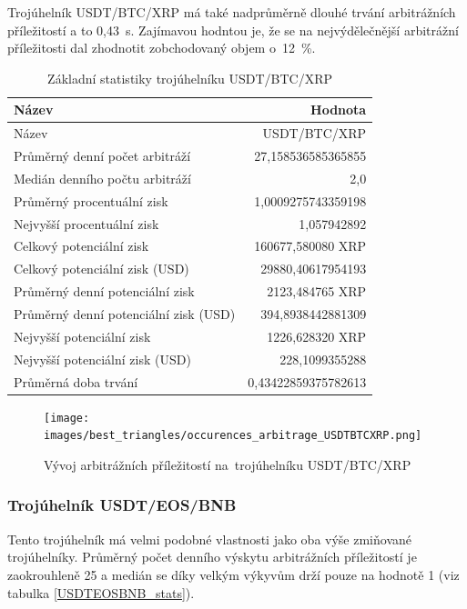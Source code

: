 \documentclass[thesis=B,czech]{FITthesis}[2019/03/21]
\begin{document}
Trojúhelník USDT/BTC/XRP má také nadprůměrně dlouhé trvání arbitrážních příležitostí a to 0,43~s. Zajímavou hodntou je, že se na \linebreak nejvýdělečnější arbitrážní příležitosti dal zhodnotit zobchodovaný \linebreak objem o~12~\%. 



\begin{table}\centering
\caption{Základní statistiky trojúhelníku USDT/BTC/XRP}
\label{USDTBTCXRP_stats}
\begin{tabular}{|| l | r ||}
\hline Název & Hodnota \\ 
\hline\hline Název & USDT/BTC/XRP \\ 
\hline Průměrný denní počet arbitráží & 27,158536585365855 \\ 
\hline Medián denního počtu arbitráží & 2,0 \\ 
\hline Průměrný procentuální zisk & 1,0009275743359198 \\ 
\hline Nejvyšší procentuální zisk & 1,057942892 \\ 
\hline Celkový potenciální zisk & 160677,580080 XRP \\ 
\hline Celkový potenciální zisk (USD) & 29880,40617954193 \\ 
\hline Průměrný denní potenciální zisk & 2123,484765 XRP \\ 
\hline Průměrný denní potenciální zisk (USD) & 394,8938442881309 \\ 
\hline Nejvyšší potenciální zisk & 1226,628320 XRP \\ 
\hline Nejvyšší potenciální zisk (USD) & 228,1099355288 \\ 
\hline Průměrná doba trvání & 0,43422859375782613 \\ 
\hline
\end{tabular}
\end{table}

\begin{figure}\centering
	\texttt{[image: images/best\_triangles/occurences\_arbitrage\_USDTBTCXRP.png]}
	\caption{Vývoj arbitrážních příležitostí na~trojúhelníku USDT/BTC/XRP }\label{occurences_arbitrage_USDTBTCXRP}
\end{figure}

\subsubsection{Trojúhelník USDT/EOS/BNB}
Tento trojúhelník má velmi podobné vlastnosti jako oba výše zmiňované \linebreak trojúhelníky. Průměrný počet denního výskytu arbitrážních příležitostí je zaokrouhleně 25 a medián se díky velkým výkyvům drží pouze na hodnotě 1 (viz tabulka \ref{USDTEOSBNB_stats}).
\end{document}
